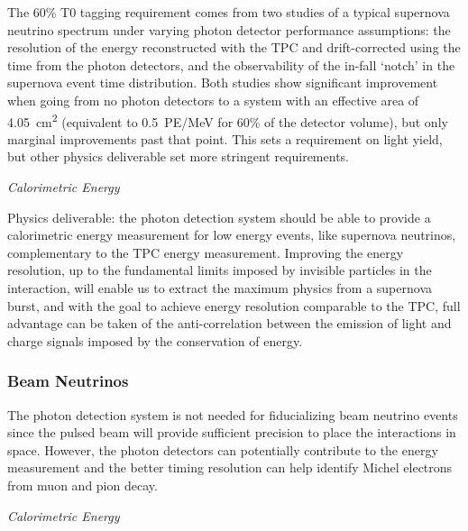 The 60\% T0 tagging requirement comes from two studies of a typical supernova neutrino spectrum under varying photon detector performance assumptions: the resolution of the energy reconstructed with the TPC and drift-corrected using the time from the photon detectors, and the observability of the in-fall `notch' in the supernova event time distribution. Both studies show significant improvement when going from no photon detectors to a system with an effective area of \SI{4.05}{cm^2} (equivalent to \SI{0.5}{PE/MeV} for 60\% of the detector volume), but only marginal improvements past that point. This sets a requirement on light yield, but other physics deliverable set more stringent requirements.


\textit{\it Calorimetric Energy}

Physics deliverable: the photon detection system should be able to provide a calorimetric energy measurement for low energy events, like supernova neutrinos, complementary to the TPC energy measurement. 
Improving the energy resolution, up to the fundamental limits imposed by invisible particles in the interaction, will enable us to extract the maximum physics from a supernova burst, and with the goal to achieve energy resolution comparable to the TPC, full advantage can be taken of the anti-correlation between the emission of light and charge signals imposed by the conservation of energy.



\subsubsection{Beam Neutrinos}

The photon detection system is not needed for fiducializing beam neutrino events since the pulsed beam will provide sufficient precision to place the interactions in space. However, the photon detectors can potentially contribute to the energy measurement and the better timing resolution can help identify Michel electrons from muon and pion decay.


\textit{\it Calorimetric Energy}

